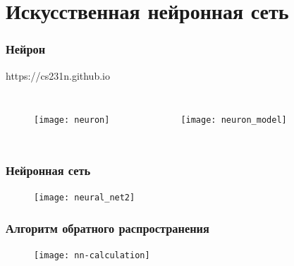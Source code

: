 \documentclass[notheorems]{beamer} %
\begin{document}
\section{Искусственная нейронная сеть}
\begin{frame}
	\frametitle{Нейрон}
	https://cs231n.github.io
	
		\begin{columns}
		
		\begin{figure}
	\texttt{[image: neuron]}
\end{figure}
		
		\begin{figure}
			\texttt{[image: neuron\_model]}
		\end{figure}
	\end{columns}
\end{frame}

\begin{frame}
	\frametitle{Нейронная сеть}

		\begin{figure}
			\texttt{[image: neural\_net2]}
		\end{figure}
\end{frame}
\begin{frame}
	\frametitle{Алгоритм обратного распространения}
	
	\begin{figure}
		\texttt{[image: nn-calculation]}
	\end{figure}
\end{frame}
\end{document}
